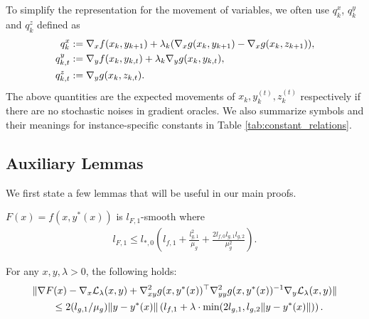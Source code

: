 To simplify the representation for the movement of variables, we often use $q_k^x$, $q_k^y$ and $q_k^z$ defined as
\begin{align}
    q_k^x &:= \nabla_x f(x_k, y_{k+1}) + \lambda_k (\nabla_x g(x_k, y_{k+1}) - \nabla_x g(x_k, z_{k+1})), \nonumber \\
    q_{k,t}^y &:= \nabla_y f(x_k, y_{k,t}) + \lambda_k \nabla_y g(x_k, y_{k,t}), \nonumber \\
    q_{k,t}^z &:= \nabla_y g(x_k, z_{k,t}). \label{eq:qk_def}
\end{align}
The above quantities are the expected movements of $x_k, y_k^{(t)}, z_k^{(t)}$ respectively if there are no stochastic noises in gradient oracles. We also summarize symbols and their meanings for instance-specific constants in Table \ref{tab:constant_relations}.







\subsection{Auxiliary Lemmas}
We first state a few lemmas that will be useful in our main proofs.





\begin{lemma}
    \label{lemma:outer_F_smooth}
    $F(x) = f(x, y^*(x))$ is $l_{F,1}$-smooth where
    \begin{align*}
        l_{F,1} \le l_{*,0} \left(l_{f,1} + \frac{l_{g,1}^2}{\mu_g} + \frac{2l_{f,0}l_{g,1}l_{g,2}}{\mu_g^2} \right).
    \end{align*}
\end{lemma}












\begin{lemma}
    \label{lemma:relation_Lagrangian_F}
    For any $x,y, \lambda > 0$, the following holds:
    \begin{align*}
        &\|\nabla F(x) - \nabla_x \mathcal{L}_\lambda(x,y) + \nabla_{xy}^2 g(x,y^*(x))^\top \nabla^2_{yy} g(x,y^*(x))^{-1} \nabla_y \mathcal{L}_\lambda(x,y)\| \\
        &\qquad \le 2 (l_{g,1}/\mu_g) \|y-y^*(x)\| \left(l_{f,1} + \lambda \cdot \min(2l_{g,1}, l_{g,2} \|y-y^*(x)\|)\right).
    \end{align*}
\end{lemma}

